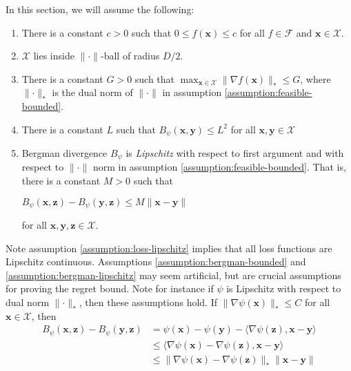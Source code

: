 \documentclass[12pt, a4paper]{report}
\begin{document}
In this section, we will assume the following:
\begin{enumerate}
    \item There is a constant $c > 0$ such that $0 \leq f(\mathbf{x})  \leq c$ for all $f \in \mathcal{F}$ and $\mathbf{x} \in \mathcal{X}$. \label{assumption:loss-bounded}
    \item $\mathcal{X}$ lies inside $\lVert \cdot \rVert$-ball of radius $D/2$.\label{assumption:feasible-bounded}
    \item There is a constant $G >0$ such that $\displaystyle \max_{\mathbf{x} \in \mathcal{X}} \lVert \nabla f(\mathbf{x}) \rVert_* \leq G$, where $\lVert \cdot \rVert_*$ is the dual norm of $\lVert \cdot \rVert$ in assumption \ref{assumption:feasible-bounded}. \label{assumption:loss-lipschitz}
    \item There is a constant $L$ such that $B_\psi(\mathbf{x}, \mathbf{y}) \leq L^2$ for all $\mathbf{x}, \mathbf{y} \in \mathcal{X}$ \label{assumption:bergman-bounded}
    \item Bergman divergence $B_\psi$ is \textit{Lipschitz} with respect to first argument and with respect to $\lVert \cdot \rVert$ norm in assumption \ref{assumption:feasible-bounded}. That is, there is a constant $M > 0$ such that
    \begin{center}
        $B_\psi(\mathbf{x}, \mathbf{z}) - B_\psi(\mathbf{y}, \mathbf{z}) \leq M \lVert \mathbf{x} -\mathbf{y} \rVert$
    \end{center} 
    for all $\mathbf{x}, \mathbf{y}, \mathbf{z} \in \mathcal{X}$.\label{assumption:bergman-lipschitz}
\end{enumerate}
Note assumption \ref{assumption:loss-lipschitz} implies that all loss functions are Lipschitz continuous. Assumptions \ref{assumption:bergman-bounded} and \ref{assumption:bergman-lipschitz} may seem artificial, but are crucial assumptions for proving the regret bound. Note for instance if $\psi$ is Lipschitz with respect to dual norm $\lVert \cdot \rVert_{*}$, then these assumptions hold. If $\lVert \nabla \psi(\mathbf{x}) \rVert_* \leq C$ for all $\mathbf{x} \in \mathcal{X}$, then 
\begin{align*}
    B_\psi(\mathbf{x}, \mathbf{z}) - B_\psi(\mathbf{y}, \mathbf{z}) &= \psi(\mathbf{x}) - \psi(\mathbf{y}) - \langle \nabla \psi(\mathbf{z}), \mathbf{x} -\mathbf{y} \rangle
    \\
    &\leq \langle \nabla \psi(\mathbf{x}) - \nabla\psi(\mathbf{z}), \mathbf{x} - \mathbf{y} \rangle
    \\
    &\leq \lVert \nabla \psi(\mathbf{x}) - \nabla\psi(\mathbf{z})\rVert_* \lVert \mathbf{x} - \mathbf{y} \rVert
\end{align*}
\end{document}
